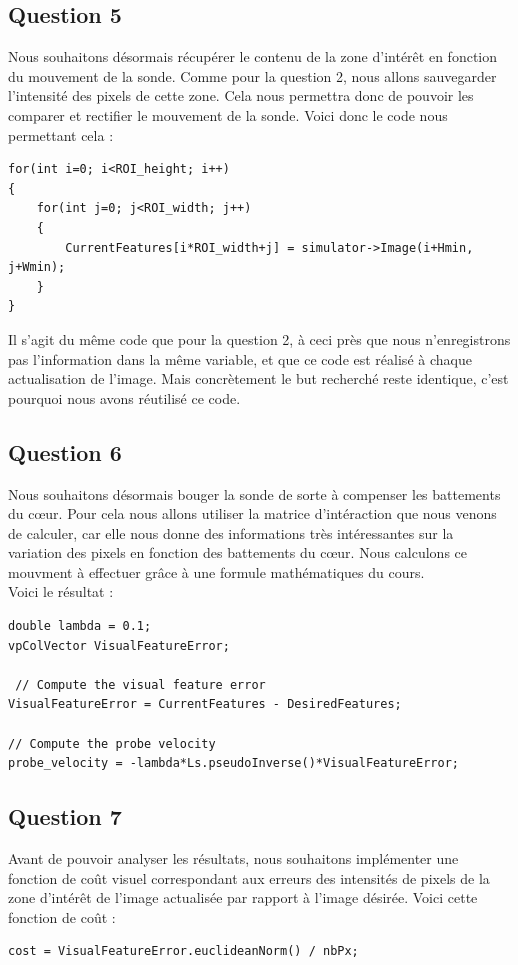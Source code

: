 \documentclass[a4paper,11pt]{article}
\begin{document}
\subsection{Question 5}
Nous souhaitons d\'esormais r\'ecup\'erer le contenu de la zone d'int\'er\^et en fonction du mouvement de la sonde. Comme pour la question 2, nous allons sauvegarder l'intensit\'e des pixels de cette zone. Cela nous permettra donc de pouvoir les comparer et rectifier le mouvement de la sonde. Voici donc le code nous permettant cela :
\begin{verbatim}
for(int i=0; i<ROI_height; i++) 
{
    for(int j=0; j<ROI_width; j++) 
    {
        CurrentFeatures[i*ROI_width+j] = simulator->Image(i+Hmin, j+Wmin);
    }
}
\end{verbatim}
Il s'agit du m\^eme code que pour la question 2, \`a ceci pr\`es que nous n'enregistrons pas l'information dans la m\^eme variable, et que ce code est r\'ealis\'e \`a chaque actualisation de l'image. Mais concr\`etement le but recherch\'e reste identique, c'est pourquoi nous avons r\'eutilis\'e ce code.

\subsection{Question 6}
Nous souhaitons d\'esormais bouger la sonde de sorte \`a compenser les battements du c\oe ur. Pour cela nous allons utiliser la matrice d'int\'eraction que nous venons de calculer, car elle nous donne des informations tr\`es int\'eressantes sur la variation des pixels en fonction des battements du c\oe ur. Nous calculons ce mouvment \`a effectuer gr\^ace \`a une formule math\'ematiques du cours.\\

Voici le r\'esultat : 
\begin{verbatim}
double lambda = 0.1;
vpColVector VisualFeatureError;

 // Compute the visual feature error
VisualFeatureError = CurrentFeatures - DesiredFeatures;

// Compute the probe velocity
probe_velocity = -lambda*Ls.pseudoInverse()*VisualFeatureError; 
\end{verbatim}

\subsection{Question 7}
Avant de pouvoir analyser les r\'esultats, nous souhaitons impl\'ementer une fonction de co\^ut visuel correspondant aux erreurs des intensit\'es de pixels de la zone d'int\'er\^et de l'image actualis\'ee par rapport \`a l'image d\'esir\'ee. Voici cette fonction de co\^ut : 
\begin{verbatim}
cost = VisualFeatureError.euclideanNorm() / nbPx;
\end{verbatim}
\end{document}
